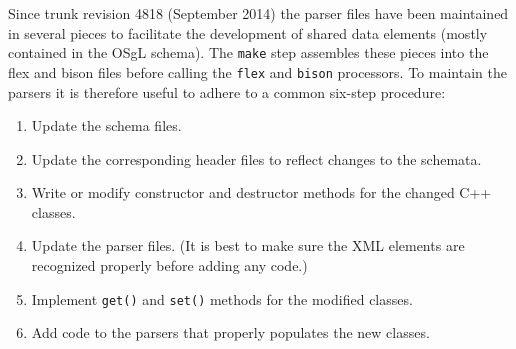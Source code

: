 Since trunk revision 4818 (September 2014) the parser files have been maintained 
in several pieces to facilitate the development of shared data elements 
(mostly contained in the OSgL schema). 
The {\tt make} step assembles these pieces into the flex and bison files before 
calling the {\tt flex}  and {\tt bison}   processors. 
To maintain the parsers it is therefore useful to adhere to a common six-step procedure:

\begin{enumerate}
\item Update the schema files.
\item Update the corresponding header files to reflect changes to the schemata.
\item Write or modify constructor and destructor methods for the changed C++ classes.
\item Update the parser files. (It is best to make sure the XML elements are recognized
        properly before adding any code.)
\item Implement {\tt get()} and {\tt set()} methods for the modified classes.
\item Add code to the parsers that properly populates the new classes.
\end{enumerate} 
         
